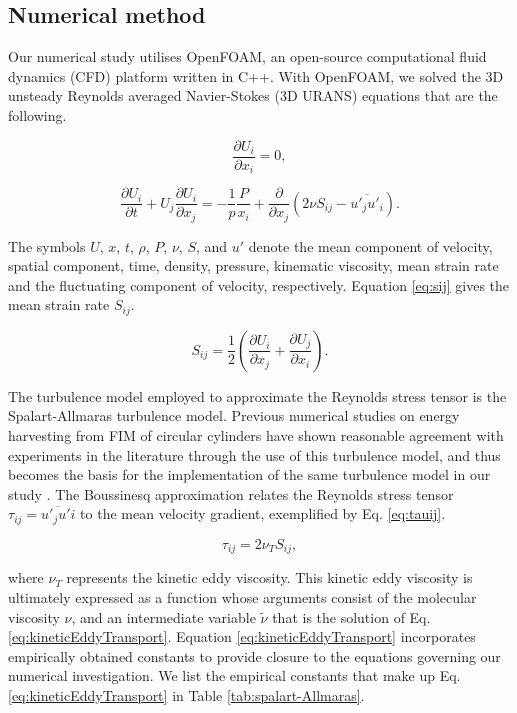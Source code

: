 \documentclass[a4paper,fleqn]{cas-sc}
\begin{document}
\subsection{Numerical method} \label{ssec:numMeth}
Our numerical study utilises OpenFOAM, an open-source computational fluid dynamics (CFD) platform written in C++. With OpenFOAM, we solved the 3D unsteady Reynolds averaged Navier-Stokes (3D URANS) equations that are the following.

\begin{equation}
  \frac{\partial U_{i}}{\partial x_{i}}=0,
  \label{eq:continuity}
\end{equation}

\begin{equation}
  \frac{\partial U_{i}}{\partial t}+U_{j}\frac{\partial U_{i}}{\partial x_{j}} = -\frac{1}{p}\frac{P}{x_{i}}+\frac{\partial}{\partial x_{j}} \left( 2\nu S_{ij}-\overline{u'_{j}u'_{i}} \right).
  \label{eq:navier-stokes}
\end{equation}

The symbols $U$, $x$, $t$, $\rho$, $P$, $\nu$, $S$, and $u'$ denote the mean component of velocity, spatial component, time, density, pressure, kinematic viscosity, mean strain rate and the fluctuating component of velocity, respectively. Equation \ref{eq:sij} gives the mean strain rate $S_{ij}$.

\begin{equation}
  S_{ij} = \frac{1}{2} \left( \frac{\partial U_{i}}{\partial x_{j}} + \frac{\partial U_{j}}{\partial x_{i}} \right).
  \label{eq:sij}
\end{equation}

The turbulence model employed to approximate the Reynolds stress tensor is the Spalart-Allmaras turbulence model. Previous numerical studies on energy harvesting from FIM of circular cylinders have shown reasonable agreement with experiments in the literature through the use of this turbulence model, and thus becomes the basis for the implementation of the same turbulence model in our study \citep{Ding2015a,Ding2015b}. The Boussinesq approximation relates the Reynolds stress tensor $\tau_{ij} = \overline{u'_{j}u'{i}}$ to the mean velocity gradient, exemplified by Eq. \ref{eq:tauij}.

\begin{equation}
  \tau_{ij} = 2 \nu_{T}S_{ij},
  \label{eq:tauij}
\end{equation}

\noindent where $\nu_{T}$ represents the kinetic eddy viscosity. This kinetic eddy viscosity is ultimately expressed as a function whose arguments consist of the molecular viscosity $\nu$, and an intermediate variable $\tilde{\nu}$ that is the solution of Eq. \ref{eq:kineticEddyTransport}. Equation \ref{eq:kineticEddyTransport} incorporates empirically obtained constants to provide closure to the equations governing our numerical investigation. We list the empirical constants that make up Eq. \ref{eq:kineticEddyTransport} in Table \ref{tab:spalart-Allmaras}.
\end{document}
